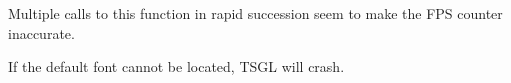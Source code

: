 
\begin{DoxyRefList}
\item[\label{bug__bug000001}%
\hypertarget{bug__bug000001}{}%
Member \hyperlink{classtsgl_1_1_canvas_ac035f43763b198f6915a0772973a5ea9}{tsgl\+:\+:Canvas\+:\+:take\+Screen\+Shot} ()]Multiple calls to this function in rapid succession seem to make the F\+P\+S counter inaccurate.  
\item[\label{bug__bug000002}%
\hypertarget{bug__bug000002}{}%
Member \hyperlink{classtsgl_1_1_texture_handler_a7f3103ea7f43f5a042609b443a748c88}{tsgl\+:\+:Texture\+Handler\+:\+:draw\+Text} (std\+::wstring text, unsigned int font\+\_\+size, float $\ast$vertices)]If the default font cannot be located, T\+S\+G\+L will crash. 
\end{DoxyRefList}